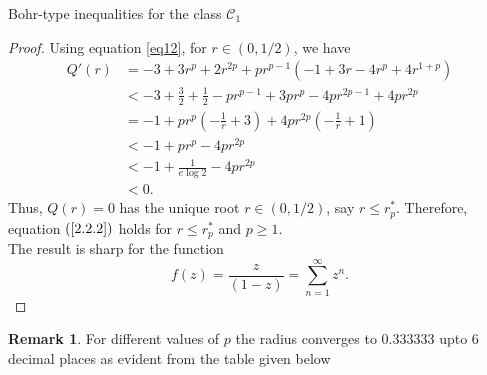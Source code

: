 \documentclass[12pt,a4paper,reqno]{amsart}
\theoremstyle{definition}
\newtheorem{remark}[definition]{Remark}
\theoremstyle{plain}
\numberwithin{equation}{section}
\begin{document}
\begin{section}{Bohr-type inequalities for the class $\mathcal{C}_1$}
\begin{proof}
Using equation \eqref{eq12}, for $r\in(0, 1/2)$, we have
\begin{align*}
Q'(r)&=-3+3 r^p+2 r^{2 p}+p r^{p-1} \left(-1+3 r-4 r^p+4 r^{1+p}\right)\\
&<-3+\frac{3}{2}+\frac{1}{2}-p r^{p-1} +3pr^p -4p r^{2p-1}+4p r^{2p}\\
&=-1+pr^p\left(-\frac{1}{r}+3\right)+4pr^{2p}\left(-\frac{1}{r}+1\right)\\
&<-1+pr^p-4pr^{2p}\\
&<-1+\frac{1}{e \log 2}-4pr^{2p}\\
&<0.
\end{align*}
Thus, $Q(r)=0$ has the unique root $r\in (0, 1/2)$, say $r \le r^*_{p}$.
Therefore, equation $(\ref{2.2.2})$ holds for $r \le r^*_{p}$ and $p \ge 1$.
\\
\noindent
The result is sharp for the function
\begin{equation*}
    f(z)=\frac{z}{(1-z)}=\sum_{n=1}^{\infty} z^n.
\end{equation*}
\end{proof}
\begin{remark}
For different values of $p$ the radius converges to $0.333333$ upto $6$ decimal places as evident from the table given below

\end{remark}
\end{section}
\end{document}
